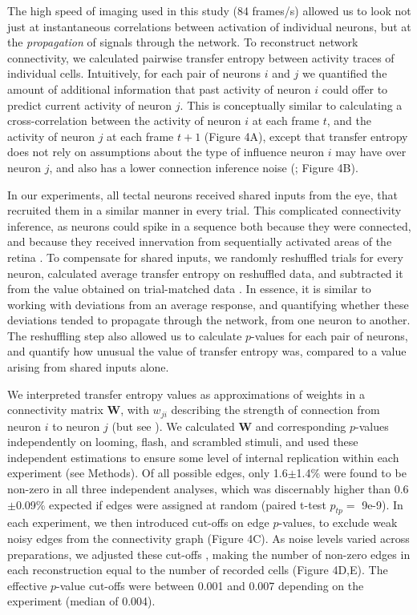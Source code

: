 \documentclass{article}
\begin{document}
The high speed of imaging used in this study (84 frames/s) allowed us to look not just at instantaneous correlations between activation of individual neurons, but at the \textit{propagation} of signals through the network. To reconstruct network connectivity, we calculated pairwise transfer entropy \citep{gourevitch2007te, stetter2012te} between activity traces of individual cells. Intuitively, for each pair of neurons $i$ and $j$ we quantified the amount of additional information that past activity of neuron $i$ could offer to predict current activity of neuron $j$. This is conceptually similar to calculating a cross-correlation between the activity of neuron $i$ at each frame $t$, and the activity of neuron $j$ at each frame $t+1$ (Figure 4A), except that transfer entropy does not rely on assumptions about the type of influence neuron $i$ may have over neuron $j$, and also has a lower connection inference noise (\citealt{stetter2012te}; Figure 4B).

In our experiments, all tectal neurons received shared inputs from the eye, that recruited them in a similar manner in every trial. This complicated connectivity inference, as neurons could spike in a sequence both because they were connected, and because they received innervation from sequentially activated areas of the retina \citep{mehler2018lure}. To compensate for shared inputs, we randomly reshuffled trials for every neuron, calculated average transfer entropy on reshuffled data, and subtracted it from the value obtained on trial-matched data \citep{gourevitch2007te, wollstadt2014te}. In essence, it is similar to working with deviations from an average response, and quantifying whether these deviations tended to propagate through the network, from one neuron to another. The reshuffling step also allowed us to calculate $p$-values for each pair of neurons, and quantify how unusual the value of transfer entropy was, compared to a value arising from shared inputs alone.

We interpreted transfer entropy values as approximations of weights in a connectivity matrix $\textbf{W}$, with $w_{ji}$ describing the strength of connection from neuron $i$ to neuron $j$ (but see \citealt{mehler2018lure}). We calculated $\textbf{W}$ and corresponding $p$-values independently on looming, flash, and scrambled stimuli, and used these independent estimations to ensure some level of internal replication within each experiment (see Methods). Of all possible edges, only 1.6$\pm$1.4\% were found to be non-zero in all three independent analyses, which was discernably higher than 0.6$\pm$0.09\% expected if edges were assigned at random (paired t-test $p_{tp}=$ 9e-9). In each experiment, we then introduced cut-offs on edge $p$-values, to exclude weak noisy edges from the connectivity graph (Figure 4C). As noise levels varied across preparations, we adjusted these cut-offs \citep{stetter2012te}, making the number of non-zero edges in each reconstruction equal to the number of recorded cells (Figure 4D,E). The effective $p$-value cut-offs were between 0.001 and 0.007 depending on the experiment (median of 0.004).
\end{document}
